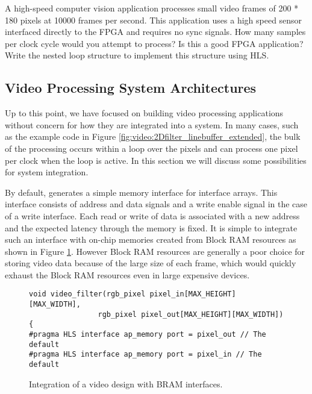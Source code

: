 \begin{exercise}
A high-speed computer vision application processes small video frames of 200 * 180 pixels at 10000 frames per second.  This application uses a high speed sensor interfaced directly to the FPGA and requires no sync signals.  How many samples per clock cycle would you attempt to process?  Is this a good FPGA application?  Write the nested loop structure to implement this structure using HLS.  
\end{exercise}

\subsection{Video Processing System Architectures}
\label{sec:video:architectures}
Up to this point, we have focused on building video processing applications without concern for how they are integrated into a system.  In many cases, such as the example code in Figure \ref{fig:video:2Dfilter_linebuffer_extended}, the bulk of the processing occurs within a loop over the pixels and can process one pixel per clock when the loop is active.  In this section we will discuss some possibilities for system integration.

By default, \VHLS generates a simple memory interface for interface arrays.  This interface consists of address and data signals and a write enable signal in the case of a write interface.  Each read or write of data is associated with a new address and the expected latency through the memory is fixed.  It is simple to integrate such an interface with on-chip memories created from Block RAM resources as shown in Figure \ref{fig:video:BRAM_interface}.  However Block RAM resources are generally a poor choice for storing video data because of the large size of each frame, which would quickly exhaust the Block RAM resources even in large expensive devices.

\begin{figure}
\centering
\framebox{{\tiny }}

\begin{scriptsize}
\begin{lstlisting}
void video_filter(rgb_pixel pixel_in[MAX_HEIGHT][MAX_WIDTH],
				rgb_pixel pixel_out[MAX_HEIGHT][MAX_WIDTH]) {
#pragma HLS interface ap_memory port = pixel_out // The default
#pragma HLS interface ap_memory port = pixel_in // The default
\end{lstlisting}
\end{scriptsize}
\caption{Integration of a video design with BRAM interfaces.}\label{fig:video:BRAM_interface}
\end{figure}

